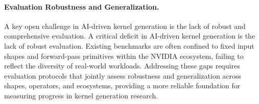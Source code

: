 \paragraph{Evaluation Robustness and Generalization.} A key open challenge in AI-driven kernel generation is the lack of robust and comprehensive evaluation. A critical deficit in AI-driven kernel generation is the lack of robust evaluation. Existing benchmarks are often confined to fixed input shapes and forward-pass primitives within the NVIDIA ecosystem, failing to reflect the diversity of real-world workloads.  Addressing these gaps requires evaluation protocols that jointly assess robustness and generalization across shapes, operators, and ecosystems, providing a more reliable foundation for measuring progress in kernel generation research.





